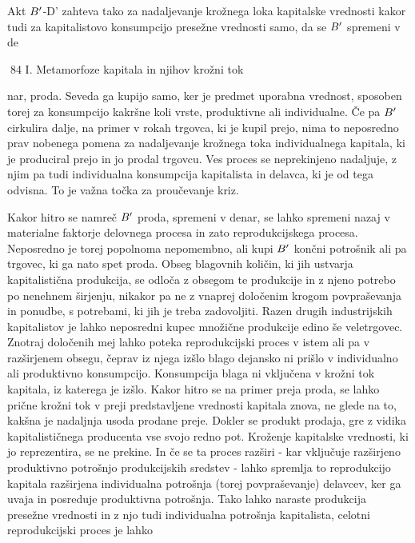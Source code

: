 \documentclass[kapital_02.tex]{subfiles}
\begin{document}
Akt \( B' \)-D' zahteva tako za nadaljevanje krožnega loka kapitalske vrednosti kakor tudi za kapitalistovo konsumpcijo presežne vrednosti samo, da se \( B' \) spremeni v de

 84 I. Metamorfoze kapitala in njihov krožni tok



 nar, proda. Seveda ga kupijo samo, ker je predmet uporabna vrednost, sposoben torej za konsumpcijo kakršne koli vrste, produktivne ali individualne. Če pa \( B' \) cirkulira dalje, na primer v rokah trgovca, ki je kupil prejo, nima to neposredno prav nobenega pomena za nadaljevanje krožnega toka individualnega kapitala, ki je produciral prejo in jo prodal trgovcu. Ves proces se neprekinjeno nadaljuje, z njim pa tudi individualna konsumpcija kapitalista in delavca, ki je od tega odvisna. To je važna točka za proučevanje kriz.

Kakor hitro se namreč \( B' \) proda, spremeni v denar, se lahko spremeni nazaj v materialne faktorje delovnega procesa in zato reprodukcijskega procesa. Neposredno je torej popolnoma nepomembno, ali kupi \( B' \) končni potrošnik ali pa trgovec, ki ga nato spet proda. Obseg blagovnih količin, ki jih ustvarja kapitalistična produkcija, se odloča z obsegom te produkcije in z njeno potrebo po nenehnem širjenju, nikakor pa ne z vnaprej določenim krogom povpraševanja in ponudbe, s potrebami, ki jih je treba zadovoljiti. Razen drugih industrijskih kapitalistov je lahko neposredni kupec množične produkcije edino še veletrgovec. Znotraj določenih mej lahko poteka reprodukcijski proces v istem ali pa v razširjenem obsegu, čeprav iz njega izšlo blago dejansko ni prišlo v individualno ali produktivno konsumpcijo. Konsumpcija blaga ni vključena v krožni tok kapitala, iz katerega je izšlo. Kakor hitro se na primer preja proda, se lahko prične krožni tok v preji predstavljene vrednosti kapitala znova, ne glede na to, kakšna je nadaljnja usoda prodane preje. Dokler se produkt prodaja, gre z vidika kapitalističnega producenta vse svojo redno pot. Kroženje kapitalske vrednosti, ki jo reprezentira, se ne prekine. In če se ta proces razširi - kar vključuje razširjeno produktivno potrošnjo produkcijskih sredstev - lahko spremlja to reprodukcijo kapitala razširjena individualna potrošnja (torej povpraševanje) delavcev, ker ga uvaja in posreduje produktivna potrošnja. Tako lahko naraste produkcija presežne vrednosti in z njo tudi individualna potrošnja kapitalista, celotni reprodukcijski proces je lahko
\end{document}
